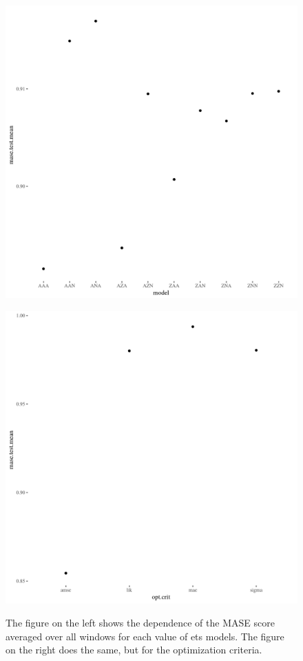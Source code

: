 \documentclass[12pt]{article}\usepackage[]{graphicx}\usepackage[]{color}
\theoremstyle{definition}
\begin{document}
\begin{figure}[h!]
\centering
\begin{minipage}{.5\textwidth}
  \centering
  \includegraphics[width=\linewidth]{ets_dep_plot_max_q.png}
  \label{fig:etsDep1}
\end{minipage}%
\begin{minipage}{.5\textwidth}
  \centering
  \includegraphics[width=\linewidth]{ets_dep_plot_max_p.png}
  \label{fig:etsDep2}
\end{minipage}
\caption{The figure on the left shows the dependence of the MASE score averaged over all windows for each value of ets models. The figure on the right does the same, but for the optimization criteria.}
\end{figure}
\end{document}
